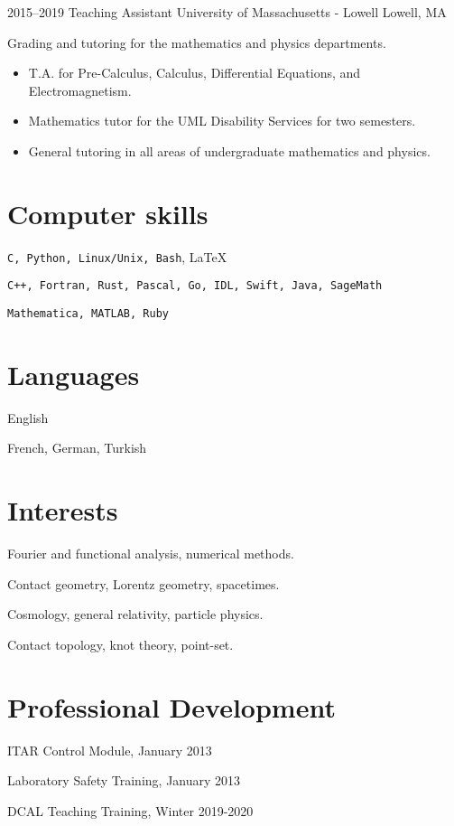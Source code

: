 \documentclass[a4paper,sans]{moderncv}
\begin{document}
            {2015--2019}
            {Teaching Assistant}
            {University of Massachusetts - Lowell}
            {Lowell, MA}
            {}
            {%
                Grading and tutoring for the mathematics
                and physics departments.
                \begin{itemize}
                    \item T.A. for Pre-Calculus, Calculus, Differential Equations,
                       and Electromagnetism.
                    \item
                        Mathematics tutor for the UML Disability
                        Services for two semesters.
                    \item
                        General tutoring in all areas of undergraduate
                        mathematics and physics.
                \end{itemize}%
            }
    \section{Computer skills}
        \texttt{C, Python, Linux/Unix, Bash}, \LaTeX\par
        \texttt{C++, Fortran, Rust, Pascal, Go, IDL, Swift, Java, SageMath}\par
        \texttt{Mathematica, MATLAB, Ruby}
    \section{Languages}
         English\par
         French, German, Turkish
    \section{Interests}
         Fourier and functional analysis, numerical methods.\par
         Contact geometry, Lorentz geometry, spacetimes.\par
         Cosmology, general relativity, particle physics.\par
         Contact topology, knot theory, point-set.
    \section{Professional Development}
        \begin{itemize}
            \begin{multicols}{2}
                \item ITAR Control Module, January 2013
                \item Laboratory Safety Training, January 2013
                \item DCAL Teaching Training, Winter 2019-2020
            \end{multicols}
        \end{itemize}
\end{document}
